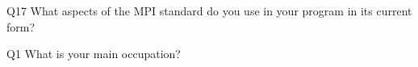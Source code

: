\begin{description}%
\item{Q17} What aspects of the MPI standard do you use in your program in its current form?%
\item{Q1} What is your main occupation?%
\end{description}%

